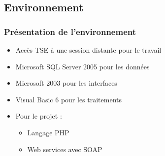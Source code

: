 \subsection{Environnement}

\begin{frame}
	\frametitle{Présentation de l'environnement}
	
	\begin{itemize}
		\item Accès TSE à une session distante pour le travail\sautligne
		
		\item Microsoft SQL Server 2005 pour les données
		\item Microsoft  2003 pour les interfaces
		\item Visual Basic 6 pour les traitements\sautligne
		
		\item Pour le projet :
			\begin{itemize}
				\item Langage PHP
				\item Web services avec SOAP
			\end{itemize}
	\end{itemize}
\end{frame}
